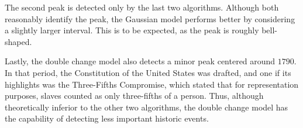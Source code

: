 The second peak is detected only by the last two algorithms. Although both reasonably identify the peak, the Gaussian model performs better by considering a slightly larger interval. This is to be expected, as the peak is roughly bell-shaped.

Lastly, the double change model also detects a minor peak centered around $1790$. In that period, the Constitution of the United States was drafted, and one if its highlights was the Three-Fifths Compromise, which stated that for representation purposes, slaves counted as only three-fifths of a person. Thus, although theoretically inferior to the other two algorithms, the double change model has the capability of detecting less important historic events.
